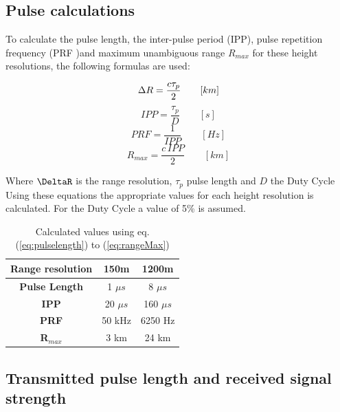 \subsection{Pulse calculations}
To calculate the pulse length, the inter-pulse period (IPP), pulse repetition frequency (PRF )and maximum unambiguous range 	$R_{max}$ for these height resolutions, the following formulas are used:

\begin{center}
\begin{equation}
\centering
\label{eq:pulselength}
	\Delta R = \frac{c \tau_p }{2} \qquad [km]
\end{equation}
\begin{equation}
\label{eq:ipp}
	{IPP} = \frac{\tau_p }{D} \qquad [s] 
\end{equation}
\begin{equation}
\label{eq:prf}
	PRF = \frac{1}{IPP} \qquad [Hz]
\end{equation}
\begin{equation}
\label{eq:rangeMax}
	R_{max} = \frac{c \,  {IPP} }{2} \qquad [km]
\end{equation}
\end{center}

Where $\DeltaR$ is the range resolution, $\tau_p$ pulse length and $D$ the Duty Cycle
Using these equations the appropriate values for each height resolution is calculated. For the Duty Cycle a value of 5\% is assumed.

\begin{center}
\begin{table}
\label{tab:range}
	\caption{Calculated values using eq. (\ref{eq:pulselength}) to (\ref{eq:rangeMax})}
\begin{center}
\begin{tabular}{ |c | c | c|}
	\hline
	\textbf{Range resolution} & \textbf{150m} & \textbf{1200m} \\
	\hline
	\textbf{Pulse Length} & 1 $\mu s$ & 8 $\mu s$ \\
	\textbf{IPP} & 20 $\mu s$  & 160 $\mu s$ \\
	\textbf{PRF} & 50 kHz & 6250 Hz\\
	\textbf{ R$_{max}$} & 3 km & 24 km\\
	\hline	
\end{tabular}
\end{center}
\end{table}
\end{center}


\subsection{Transmitted pulse length and received signal strength}

